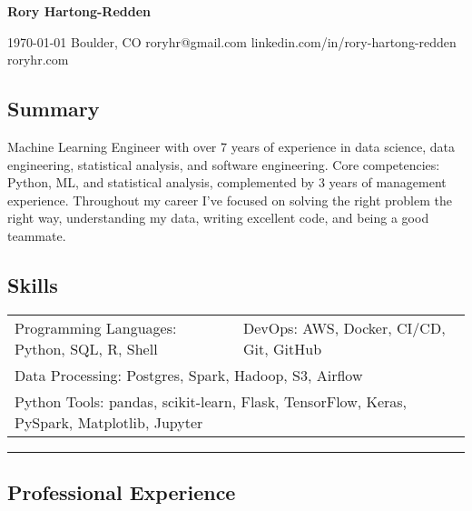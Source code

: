 \documentclass[10pt,letterpaper]{article}
\newenvironment{indentsection}[1]
{\begin{list}{}%
	{\setlength{\leftmargin}{#1}}
	\item[]%
}
{\end{list}}
\begin{document}
{\raggedright \LARGE \bf Rory Hartong-Redden}

{\raggedleft 
\today \/ \textbar
\/ Boulder, CO \textbar
\/ roryhr@gmail.com \textbar
\/ linkedin.com/in/rory-hartong-redden \textbar
\/ roryhr.com
\\
}


\subsection*{Summary}
\begin{centering}
Machine Learning Engineer with over 7 years of experience in data science, data engineering, statistical analysis, and software engineering. 
Core competencies: Python, ML, and statistical analysis, complemented by 3 years of management experience. 
Throughout my career I've focused on solving the right problem the right way, understanding my data, writing excellent code, and being a good teammate.
\end{centering}

\subsection*{Skills}
\begin{indentsection}{\parindent}
\begin{tabular}{p{0.5\linewidth}   p{0.5\linewidth}} 
    Programming Languages: Python, SQL, R, Shell
    & DevOps: AWS, Docker, CI/CD, Git, GitHub \\

    \multicolumn{2}{l}{Data Processing: Postgres, Spark, Hadoop, S3, Airflow} \\
    \multicolumn{2}{l}{
        Python Tools: pandas, scikit-learn, Flask, TensorFlow, Keras, PySpark, Matplotlib, Jupyter
        } \\
\end{tabular}
\end{indentsection}

\hrule
\subsection*{Professional Experience}
\end{document}
